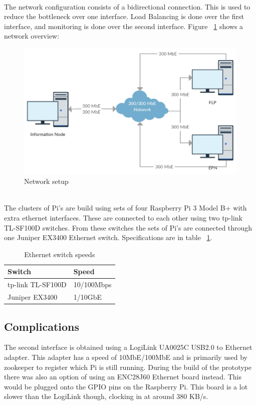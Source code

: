 ~\\ The network configuration consists of a bidirectional connection. This is used to reduce the bottleneck over one interface. Load Balancing is done over the first interface, and monitoring is done over the second interface. Figure ~\ref{fig:NetworkSetup} shows a network overview:
\begin{figure}[htb]
    \centering
    \includegraphics[scale=0.5]{./graphics/Network_thesis.pdf}
    \caption{Network setup}
    \label{fig:NetworkSetup}
\end{figure}

~\\ The clusters of Pi's are build using sets of four Raspberry Pi 3 Model B+ with extra ethernet interfaces. These are connected to each other using two tp-link TL-SF100D switches. From these switches the sets of Pi's are connected through one Juniper EX3400 Ethernet switch. Specifications are in table ~\ref{table:EthernetSpeeds}.

\begin{table}[htb]
\begin{tabular}{| l | l |}
\hline
Switch & Speed \\ \hline
tp-link TL-SF100D & 10/100Mbps \\ \hline
Juniper EX3400 & 1/10GbE \\
\hline
\end{tabular}
\caption{Ethernet switch speeds}
\label{table:EthernetSpeeds}
\end{table}

\subsection{Complications}
The second interface is obtained using a LogiLink UA0025C USB2.0 to Ethernet adapter. This adapter has a speed of 10MbE/100MbE and is primarily used by zookeeper to register which Pi is still running. During the build of the prototype there was also an option of using an ENC28J60 Ethernet board instead. This would be plugged onto the GPIO pins on the Raspberry Pi. This board is a lot slower than the LogiLink though, clocking in at around 380 KB/s. 

